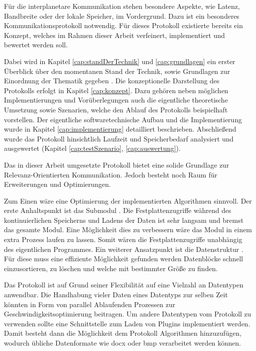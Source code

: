 Für die interplanetare Kommunikation stehen besondere Aspekte, wie Latenz,
Bandbreite oder der lokale Speicher, im Vordergrund. Dazu ist ein besonderes
Kommunikationsprotokoll notwendig. Für dieses Protokoll  existierte
bereits ein Konzept, welches im Rahmen dieser Arbeit verfeinert, implementiert
und bewertet werden soll.

Dabei wird in Kapitel \ref{cap:standDerTechnik} und \ref{cap:grundlagen} ein
erster Überblick über den momentanen Stand der Technik, sowie Grundlagen zur
Einordnung der Thematik gegeben .
Die konzeptionelle Darstellung des Protokolls erfolgt in Kapitel
\ref{cap:konzept}. Dazu gehören neben möglichen Implementierungen und
Vorüberlegungen auch die eigentliche theoretische Umsetzung sowie Szenarien,
welche den Ablauf des Protokolls beispielhaft vorstellen. Der eigentliche
softwaretechnische Aufbau und die Implementierung wurde in Kapitel
\ref{cap:implementierung} detailliert beschrieben. Abschließend wurde das
Protokoll hinsichtlich Laufzeit und Speicherbedarf analysiert und ausgewertet
(Kapitel \ref{cap:testSzenario}, \ref{cap:auswertung}). 

Das in dieser Arbeit umgesetzte Protokoll bietet eine solide
Grundlage zur Relevanz-Orientierten Kommunikation. Jedoch besteht noch Raum
für Erweiterungen und Optimierungen.

Zum Einen wäre eine Optimierung der implementierten Algorithmen sinnvoll.
Der erste Anhaltspunkt ist das Submodul .
Die Festplattenzugriffe während des kontinuierlichen Speicherns und Ladens der Daten
ist sehr langsam und bremst das gesamte Modul. Eine Möglichkeit dies zu
verbessern wäre das Modul in einem extra Prozess laufen zu lassen. Somit wären
die Festplattenzugriffe unabhängig des eigentlichen Programmes. Ein weiterer
Ansatzpunkt ist die Datenstruktur . Für diese muss
eine effiziente Möglichkeit gefunden werden Datenblöcke schnell
einzusortieren, zu löschen und welche mit bestimmter Größe zu finden.

Das Protokoll ist auf Grund seiner Flexibilität auf eine Vielzahl an Datentypen
anwendbar. Die Handhabung vieler Daten eines Datentyps zur selben Zeit könnten
in Form von parallel Ablaufenden Prozessen zur Geschwindigkeitsoptimierung
beitragen. Um andere Datentypen vom Protokoll zu verwenden sollte eine
Schnittstelle zum Laden von Plugins implementiert werden. Damit besteht dann die
Möglichkeit dem Protokoll Algorithmen hinzuzufügen, wodurch
übliche Datenformate wie docx oder bmp verarbeitet werden können.

